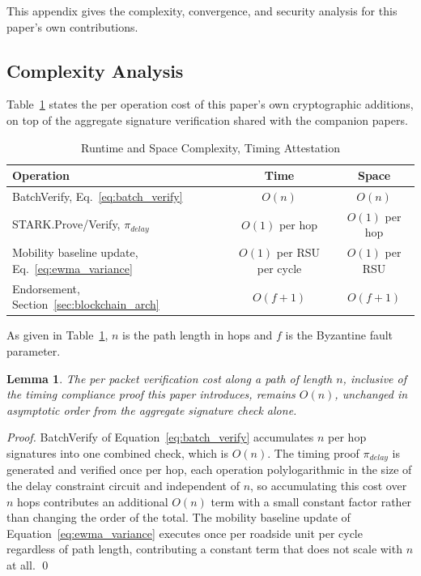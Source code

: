 \documentclass[final,5p,twocolumn]{elsarticle}
\newtheorem{lemma}{Lemma}
\theoremstyle{remark}
\theoremstyle{plain}
\begin{document}
This appendix gives the complexity, convergence, and security analysis for
this paper's own contributions.


\subsection{Complexity Analysis}
\label{app:complexity}

Table~\ref{tab:phantom_complexity} states the per operation cost of this
paper's own cryptographic additions, on top of the aggregate signature
verification shared with the companion papers.
\begin{table}[!t]
	\centering
	\caption{Runtime and Space Complexity, Timing Attestation}
	\label{tab:phantom_complexity}
	\renewcommand{\arraystretch}{1.2}
	\footnotesize
	\begin{tabular}{|l|c|c|}
		\hline
		\textbf{Operation} & \textbf{Time} & \textbf{Space} \\
		\hline
		BatchVerify, Eq.~\eqref{eq:batch_verify} & $O(n)$ & $O(n)$ \\
		\hline
		STARK.Prove/Verify, $\pi_{delay}$ & $O(1)$ per hop & $O(1)$ per hop \\
		\hline
		Mobility baseline update, Eq.~\eqref{eq:ewma_variance} & $O(1)$ per RSU per cycle & $O(1)$ per RSU \\
		\hline
		Endorsement, Section~\ref{sec:blockchain_arch} & $O(f{+}1)$ & $O(f{+}1)$ \\
		\hline
	\end{tabular}
\end{table}
As given in Table~\ref{tab:phantom_complexity}, $n$ is the path length in
hops and $f$ is the Byzantine fault parameter.

\begin{lemma}
	\label{lem:phantom_complexity}
	The per packet verification cost along a path of length $n$, inclusive
	of the timing compliance proof this paper introduces, remains $O(n)$,
	unchanged in asymptotic order from the aggregate signature check alone.
\end{lemma}
\begin{proof}
	BatchVerify of Equation~\eqref{eq:batch_verify} accumulates $n$ per hop
	signatures into one combined check, which is $O(n)$. The timing proof
	$\pi_{delay}$ is generated and verified once per hop, each operation
	polylogarithmic in the size of the delay constraint circuit and
	independent of $n$, so accumulating this cost over $n$ hops contributes
	an additional $O(n)$ term with a small constant factor rather than
	changing the order of the total. The mobility baseline update of
	Equation~\eqref{eq:ewma_variance} executes once per roadside unit per
	cycle regardless of path length, contributing a constant term that does
	not scale with $n$ at all.
	\qed
\end{proof}
\end{document}
